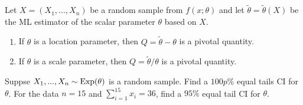 \documentclass[notoc,notitlepage]{tufte-book}
\begin{document}
\begin{propo}
\label{propo:mle_of_a_location_scale_parameter_as_a_pivotal_quantity}
  Let $X = (X_1, ..., X_n)$ be a random sample from $f(x; \theta)$ and let $\tilde{\theta} = \tilde{\theta}(X)$ be the ML estimator of the scalar parameter $\theta$ based on $X$.
  \begin{enumerate}
    \item If $\theta$ is a location parameter, then $Q = \tilde{\theta} - \theta$ is a pivotal quantity.
    \item If $\theta$ is a scale parameter, then $Q = \tilde{\theta} / \theta$ is a pivotal quantity.
  \end{enumerate}
\end{propo}


\begin{eg}[Example 6.19]
  Suppse $X_1, ..., X_n \sim \operatorname{Exp}(\theta)$ is a random sample. Find a $100p\%$ equal tails CI for $\theta$. For the data $n = 15$ and $\sum_{i=1}^{15} x_i = 36$, find a $95\%$ equal tail CI for $\theta$.
\end{eg}
\end{document}
